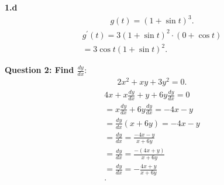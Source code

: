 \documentclass{report}
\begin{document}
    \pagebreak \bigbreak \noindent
    \begin{mdframed}
        \textbf{1.d}
        \begin{align*}
            g(t) = (1+\sin{t})^{3}
        .\end{align*}
        \bigbreak \noindent 
        \begin{align*}
            g^{\prime}(t) = 3(1+\sin{t})^{2} \cdot (0+\cos{t}) \\
            = 3\cos{t}(1+\sin{t})^{2}
        .\end{align*}
    \end{mdframed}

    \bigbreak \noindent 
    \begin{mdframed}
        \textbf{Question 2: Find $\frac{dy}{dx}$}:
        \begin{align*}
            2x^{2}+xy+3y^{2} = 0
        .\end{align*}
        \bigbreak \noindent 
        \begin{align*}
            4x+x\frac{dy}{dx} + y + 6y \frac{dy}{dx} = 0 \\ 
            = x \frac{dy}{dx} + 6y \frac{dy}{dx} = -4x-y \\
            = \frac{dy}{dx}(x+6y) = -4x -y \\
            = \frac{dy}{dx} = \frac{-4x-y}{x+6y} \\
            = \frac{dy}{dx} = \frac{-(4x+y)}{x+6y} \\
            = \frac{dy}{dx} = -\frac{4x+y}{x+6y} \\
        .\end{align*}
    \end{mdframed}
\end{document}

